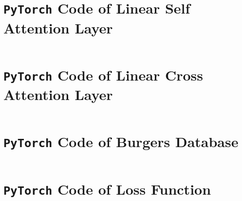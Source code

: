 \appendix
\chapter{\texttt{PyTorch} Code of Linear Self Attention Layer}
\inputminted{python}{code/linear_self_attention.py}
\chapter{\texttt{PyTorch} Code of Linear Cross Attention Layer}
\inputminted{python}{code/linear_cross_attention.py}
\chapter{\texttt{PyTorch} Code of Burgers Database}
\inputminted{python}{code/burges.py}
\chapter{\texttt{PyTorch} Code of Loss Function}
\inputminted{python}{code/loss.py}
